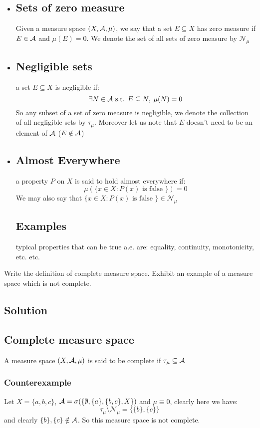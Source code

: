 \provdefs
\begin{itemize}
    \item \subsection{Sets of zero measure} 
    Given a measure space $(X,\mathcal{A},\mu)$, we say that a set $E\subseteq X$ has zero measure if $E\in\mathcal{A}$ and $\mu(E)=0$. We denote the set of all sets of zero measure by $\mathcal{N}_{\mu}$
    \item \subsection{Negligible sets} a set $E\subseteq X$ is negligible if:
    \[
        \exists N\in\mathcal{A} \text{ s.t. } E \subseteq N, \; \mu(N)=0
    \]
    So any subset of a set of zero measure is negligible, we denote the collection of all negligible sets by $\tau_{\mu}$. Moreover let us note that $E$ doesn't need to be an element of $\mathcal{A}$ ($E\notin\mathcal{A}$)
    \item \subsection{Almost Everywhere} a property $P$ on $X$ is said to hold almost everywhere if:
    \[
       \mu( \{ x\in X: P(x) \text{ is false } \} ) = 0    
    \]
    We may also say that $\{ x\in X: P(x) \text{ is false } \} \in \mathcal{N}_{\mu}$\\
    \subsection*{Examples} typical properties that can be true a.e. are: equality, continuity, monotonicity, etc. etc.
\end{itemize}


\question
Write the definition of complete measure space. Exhibit an example of a measure space which is not complete.

\subsection*{Solution}
\subsection{Complete measure space}
A measure space $(X,\mathcal{A},\mu)$ is said to be complete if $\tau_{\mu}\subseteq\mathcal{A}$
\subsubsection{Counterexample}
Let $X=\{a,b,c\}$, $\mathcal{A} = \sigma (\{\emptyset, \{a\}, \{b,c\}, X \})$ and $\mu\equiv 0$, clearly here we have:
\[
    \tau_{\mu} \setminus \mathcal{N}_{\mu}= \{ \{b\}, \{c\} \}    
\]
and clearly $\{b\}, \{c\} \notin \mathcal{A}$. So this measure space is not complete.


